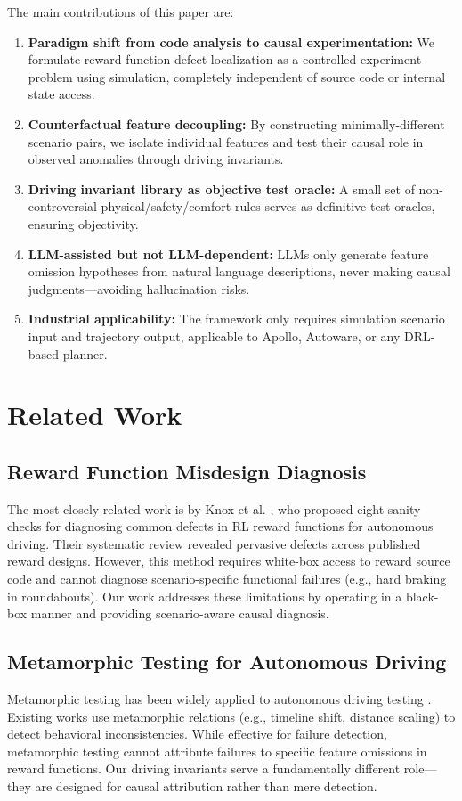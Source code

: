 \documentclass[conference]{IEEEtran}
\theoremstyle{plain}
\begin{document}
The main contributions of this paper are:
\begin{enumerate}
    \item \textbf{Paradigm shift from code analysis to causal experimentation:} We formulate reward function defect localization as a controlled experiment problem using simulation, completely independent of source code or internal state access.
    \item \textbf{Counterfactual feature decoupling:} By constructing minimally-different scenario pairs, we isolate individual features and test their causal role in observed anomalies through driving invariants.
    \item \textbf{Driving invariant library as objective test oracle:} A small set of non-controversial physical/safety/comfort rules serves as definitive test oracles, ensuring objectivity.
    \item \textbf{LLM-assisted but not LLM-dependent:} LLMs only generate feature omission hypotheses from natural language descriptions, never making causal judgments---avoiding hallucination risks.
    \item \textbf{Industrial applicability:} The framework only requires simulation scenario input and trajectory output, applicable to Apollo, Autoware, or any DRL-based planner.
\end{enumerate}

\section{Related Work}
\label{sec:related}

\subsection{Reward Function Misdesign Diagnosis}
The most closely related work is by Knox et al. \cite{knox2023reward}, who proposed eight sanity checks for diagnosing common defects in RL reward functions for autonomous driving. Their systematic review revealed pervasive defects across published reward designs. However, this method requires white-box access to reward source code and cannot diagnose scenario-specific functional failures (e.g., hard braking in roundabouts). Our work addresses these limitations by operating in a black-box manner and providing scenario-aware causal diagnosis.

\subsection{Metamorphic Testing for Autonomous Driving}
Metamorphic testing has been widely applied to autonomous driving testing \cite{deng2023rmt}. Existing works use metamorphic relations (e.g., timeline shift, distance scaling) to detect behavioral inconsistencies. While effective for failure detection, metamorphic testing cannot attribute failures to specific feature omissions in reward functions. Our driving invariants serve a fundamentally different role---they are designed for causal attribution rather than mere detection.
\end{document}
